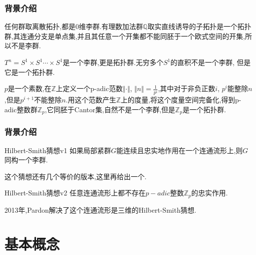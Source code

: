 \documentclass[aspectratio=169, 10pt, utf8, mathserif]{beamer}
\begin{document}
\begin{frame}[plain]
	\frametitle{背景介绍}
	\begin{example}
		任何群取离散拓扑,都是$0$维李群.有理数加法群$\mathbb{Q}$取实直线诱导的子拓扑是一个拓扑群,其连通分支是单点集,并且其任意一个开集都不能同胚于一个欧式空间的开集,所以不是李群.
	\end{example}
	\begin{example}
		$T^n=S^1\times S^1\cdots \times S^1$是一个李群,更是拓扑群.无穷多个$S^1$的直积不是一个李群, 但是它是一个拓扑群.
	\end{example}
	\begin{example}
		$p$是一个素数,在$\mathbb{Z}$上定义一个p-adic范数$\Vert\cdot\Vert$, $\Vert n\Vert=\frac{1}{p^i}$,其中对于非负正数$i$, $p^i$能整除$n$,但是$p^{i+1}$不能整除$n$.用这个范数产生$\mathbb{Z}$上的度量,将这个度量空间完备化,得到p-adic整数群$\mathbb{Z}_p$,它同胚于Cantor集,自然不是一个李群,但是$\mathbb{Z}_p$是一个拓扑群.
	\end{example}
\end{frame}

\begin{frame}[plain]
	\frametitle{背景介绍}

	\begin{block}{Hilbert-Smith猜想v1}
		如果局部紧群$G$能连续且忠实地作用在一个连通流形上,则$G$同构一个李群.
	\end{block}
	这个猜想还有几个等价的版本,这里再给出一个.
	\begin{block}{Hilbert-Smith猜想v2}
		任意连通流形上都不存在$p-adic$整数$\mathbb{Z}_p$的忠实作用.
	\end{block}

	2013年,Pardon解决了这个连通流形是三维的Hilbert-Smith猜想.
\end{frame}

\section{基本概念}
\end{document}
